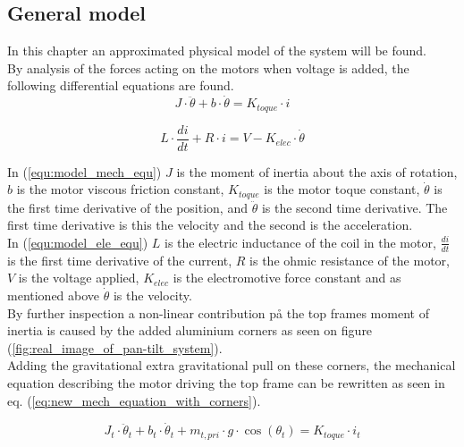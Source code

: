\documentclass[../../main]{subfiles}
\begin{document}
\subsection{General model}
\label{sec:General_model}

In this chapter an approximated physical model of the system will be found.\\

By analysis of the forces acting on the motors when voltage is added, the following differential equations are found.\\

\begin{equation}
  \label{equ:model_mech_equ}
  J\cdot \ddot \theta + b\cdot \dot \theta = K_{toque}\cdot i
\end{equation}

\begin{equation}
  \label{equ:model_ele_equ}
  L\cdot \frac{di}{dt} + R\cdot i = V - K_{elec}\cdot \dot \theta
\end{equation}

In (\ref{equ:model_mech_equ}) $J$ is the moment of inertia about the axis of rotation, $b$ is the motor viscous friction constant, $K_{toque}$ is the motor toque constant, $\dot \theta$ is the first time derivative of the position, and $\ddot \theta$ is the second time derivative. The first time derivative is this the velocity and the second is the acceleration.\\
In (\ref{equ:model_ele_equ}) $L$ is the electric inductance of the coil in the motor, $\frac{di}{dt}$ is the first time derivative of the current, $R$ is the ohmic resistance of the motor, $V$ is the voltage applied, $K_{elec}$ is the electromotive force constant and as mentioned above $\dot \theta$ is the velocity.\\

By further inspection a non-linear contribution på the top frames moment of inertia is caused by the added aluminium corners as seen on figure (\ref{fig:real_image_of_pan-tilt_system}).\\
Adding the gravitational extra gravitational pull on these corners, the mechanical equation describing the motor driving the top frame can be rewritten as seen in eq. (\ref{eq:new_mech_equation_with_corners}).

\begin{equation}
  \label{eq:new_mech_equation_with_corners}
  J_t\cdot \ddot \theta_t + b_t\cdot \dot \theta_t + m_{t,pri}\cdot g \cdot \cos(\theta_t) = K_{toque}\cdot i_t
\end{equation}
\end{document}
